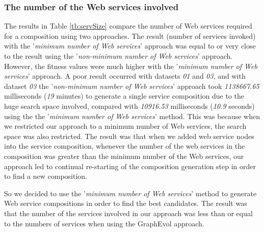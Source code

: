 
\subsubsection{The number of the Web services involved} 

The results in Table \ref{tb:servSize} compare the number of Web services required for a composition using two approaches. The result (number of services invoked) with the {'}\emph{minimum number of Web services}{'} approach was equal to or very close to the result using the {'}\emph{non-minimum number of Web services}{'} approach. However, the fitness values were much higher with the {'}\emph{minimum number of Web services}{'} approach. A poor result occurred with datasets \emph{01} and \emph{03}, and with dataset \emph{03} the {'}\emph{non-minimum number of Web services}{'} approach took \emph{1138667.65} milliseconds (\emph{19} minutes) to generate a single service composition due to the huge search space involved, compared with \emph{10916.53} milliseconds (\emph{10.9} seconds) using the the {'}\emph{minimum number of Web services}{'} method.  This was because when we restricted our approach to a minimum number of Web services, the search space was also restricted. The result was that when we added web service nodes into the service composition, whenever the number of the web services in the composition was greater than the minimum number of the Web services, our approach led to continual re-starting of the composition generation step in order to find a new composition.\par

So we decided to use the {'}\emph{minimum number of Web services}{'} method to generate Web service compositions in order to find the best candidates. The result was that the number of the services involved in our approach was less than or equal to the numbers of services when using the GraphEvol approach.\par

